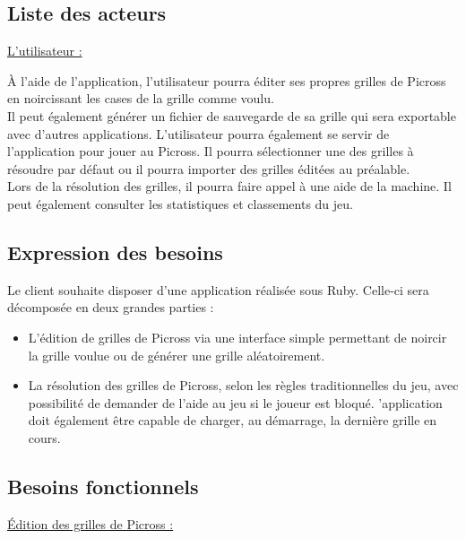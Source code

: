 \documentclass[a4paper, 12pt, twoside]{article}
\begin{document}
\subsection{Liste des acteurs}

\ul{L'utilisateur :}\newline

À l'aide de l'application, l'utilisateur pourra éditer ses propres grilles de Picross en noircissant les cases de la grille comme voulu. \\Il peut également générer un fichier de sauvegarde de sa grille qui sera exportable avec d'autres applications.
L'utilisateur pourra également se servir de l'application pour jouer au Picross. Il pourra sélectionner une des grilles à résoudre par défaut ou il pourra importer des grilles éditées au préalable.\\ Lors de la résolution des grilles, il pourra faire appel à une aide de la machine. Il peut également consulter les statistiques et classements du jeu.

\subsection{Expression des besoins}

Le client souhaite disposer d'une application réalisée sous Ruby. Celle-ci sera décomposée en deux grandes parties :\newline

\begin{itemize}\setlength{\itemsep}{3mm}

  \item[\textbullet] L'édition de grilles de Picross via une interface simple permettant de noircir la grille voulue ou de générer une grille aléatoirement.\newline
  \item[\textbullet] La résolution des grilles de Picross, selon les règles traditionnelles du jeu, avec possibilité de demander de l'aide au jeu si le joueur est bloqué.
 'application doit également être capable de charger, au démarrage, la dernière grille en cours.

\end{itemize}
 
\subsection{Besoins fonctionnels}

\ul{\'Edition des grilles de Picross :}\newline
\end{document}
